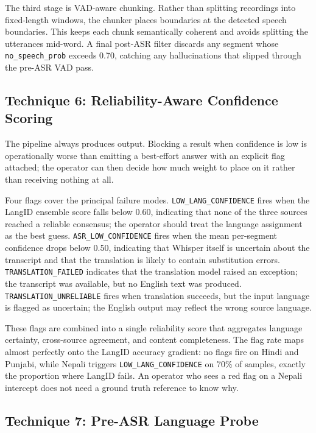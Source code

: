 \documentclass[conference]{IEEEtran}
\begin{document}
The third stage is VAD-aware chunking. Rather than splitting recordings into fixed-length windows, the chunker places boundaries at the detected speech boundaries. This keeps each chunk semantically coherent and avoids splitting the utterances mid-word. A final post-ASR filter discards any segment whose \texttt{no\_speech\_prob} exceeds 0.70, catching any hallucinations that slipped through the pre-ASR VAD pass.

\subsection{Technique 6: Reliability-Aware Confidence Scoring}
\label{sec:reliability}

The pipeline always produces output. Blocking a result when confidence is low is operationally worse than emitting a best-effort answer with an explicit flag attached; the operator can then decide how much weight to place on it rather than receiving nothing at all.

Four flags cover the principal failure modes. \texttt{LOW\_LANG\_CONFIDENCE} fires when the LangID ensemble score falls below 0.60, indicating that none of the three sources reached a reliable consensus; the operator should treat the language assignment as the best guess. \texttt{ASR\_LOW\_CONFIDENCE} fires when the mean per-segment confidence drops below 0.50, indicating that Whisper itself is uncertain about the transcript and that the translation is likely to contain substitution errors. \texttt{TRANSLATION\_FAILED} indicates that the translation model raised an exception; the transcript was available, but no English text was produced. \texttt{TRANSLATION\_UNRELIABLE} fires when translation succeeds, but the input language is flagged as uncertain; the English output may reflect the wrong source language.

These flags are combined into a single reliability score that aggregates language certainty, cross-source agreement, and content completeness. The flag rate maps almost perfectly onto the LangID accuracy gradient: no flags fire on Hindi and Punjabi, while Nepali triggers \texttt{LOW\_LANG\_CONFIDENCE} on 70\% of samples, exactly the proportion where LangID fails. An operator who sees a red flag on a Nepali intercept does not need a ground truth reference to know why.

\subsection{Technique 7: Pre-ASR Language Probe}
\label{sec:probe}
\end{document}
